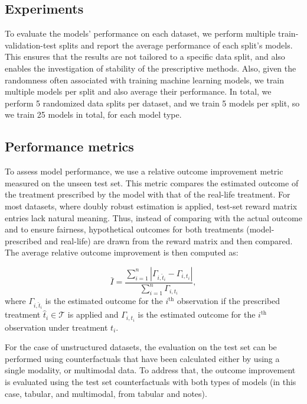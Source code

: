 \documentclass[10pt]{article} %
\begin{document}
\subsection{Experiments} \label{subsec:experiments}

To evaluate the models' performance on each dataset, we perform multiple train-validation-test splits and report the average performance of each split's models. This ensures that the results are not tailored to a specific data split, and also enables the investigation of stability of the prescriptive methods. Also, given the randomness often associated with training machine learning models, we train multiple models per split and also average their performance. In total, we perform 5 randomized data splits per dataset, and we train 5 models per split, so we train 25 models in total, for each model type.

\subsection{Performance metrics} \label{subsec:best_model}

To assess model performance, we use a relative outcome improvement metric measured on the unseen test set. This metric compares the estimated outcome of the treatment prescribed by the model with that of the real-life treatment. For most datasets, where doubly robust estimation is applied, test-set reward matrix entries lack natural meaning. Thus, instead of comparing with the actual outcome and to ensure fairness, hypothetical outcomes for both treatments (model-prescribed and real-life) are drawn from the reward matrix and then compared. The average relative outcome improvement is then computed as:

\begin{equation}
    \bar{I} = \frac{ \sum_{i=1}^{n} |\Gamma_{i,\hat{t}_{i}} - \Gamma_{i,t_{i}}|} {\sum_{i=1}^{n}\Gamma_{i,t_{i}}},
\end{equation}
where $\Gamma_{i,\hat{t}_{i}}$ is the estimated outcome for the $i^{\text{th}}$ observation if the prescribed treatment $\hat{t}_{i}\in\mathcal{T}$ is applied and $\Gamma_{i,t_{i}}$ is the estimated outcome for the $i^{\text{th}}$ observation under treatment $t_{i}$.

For the case of unstructured datasets, the evaluation on the test set can be performed using counterfactuals that have been calculated either by using a single modality, or multimodal data. To address that, the outcome improvement is evaluated using the test set counterfactuals with both types of models (in this case, tabular, and multimodal, from tabular and notes).
\end{document}
